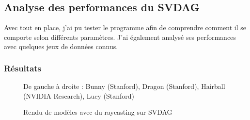\documentclass[12pt,a4paper,twoside]{article}
\begin{document}
    \subsection{Analyse des performances du SVDAG}

    Avec tout en place, j'ai pu tester le programme afin de comprendre comment il se comporte selon différents
    paramètres. J'ai également analysé ses performances avec quelques jeux de données connus.

    \subsubsection{Résultats}

    \begin{figure}[H]
        \centering
        \caption{Rendu de modèles avec du raycasting sur SVDAG}
        \begin{center}
            De gauche à droite : Bunny (Stanford), Dragon (Stanford), Hairball (NVIDIA Research), Lucy (Stanford)
        \end{center}
        \label{models}
    \end{figure}
\end{document}
